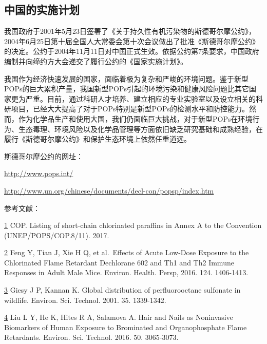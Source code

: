 \documentclass[
]{book}
\begin{document}
\hypertarget{ux4e2dux56fdux7684ux5b9eux65bdux8ba1ux5212}{%
\subsection{中国的实施计划}\label{ux4e2dux56fdux7684ux5b9eux65bdux8ba1ux5212}}

我国政府于2001年5月23日签署了《关于持久性有机污染物的斯德哥尔摩公约》，2004年6月25日第十届全国人大常委会第十次会议做出了批准《斯德哥尔摩公约》的决定。公约于2004年11月11日对中国正式生效。依据公约第7条要求，中国政府编制并向缔约方大会递交了履行公约的《国家实施计划》。

我国作为经济快速发展的国家，面临着极为复杂和严峻的环境问题。鉴于新型POPs的巨大累积产量，我国新型POPs引起的环境污染和健康风险问题比其它国家更为严重。目前，通过科研人才培养、建立相应的专业实验室以及设立相关的科研项目，已经大大提高了对于POPs特别是新型POPs的检测水平和防控能力。然而，作为化学品生产和使用大国，我们仍面临巨大挑战，对于新型POPs在环境行为、生态毒理、环境风险以及化学品管理等方面依旧缺乏研究基础和成熟经验，在履行《斯德哥尔摩公约》和保护生态环境上依然任重道远。

斯德哥尔摩公约的网址：

\url{http://www.pops.int/}

\url{http://www.un.org/chinese/documents/decl-con/popsp/index.htm}

参考文献：

\href{陈心想，耿增超。西北农林科技大学学报（自然科学版），2013，41:\%20167-174．}{1} COP. Listing of short-chain chlorinated paraffins in Annex A to the Convention (UNEP/POPS/COP.8/11). 2017.

\href{Kezhen\%20Qian,\%20Ajay\%20Kumar,\%20et.al.\%20Renew.\%20and\%20Sustain.\%20Energy\%20Reviews,\%202015,\%2042:\%201055-1064.}{2} Feng Y, Tian J, Xie H Q, et al.~Effects of Acute Low-Dose Exposure to the Chlorinated Flame Retardant Dechlorane 602 and Th1 and Th2 Immune Responses in Adult Male Mice. Environ. Health. Persp, 2016. 124. 1406-1413.

\href{Puga\%20A\%20P,\%20Abreu\%20C\%20A,\%20et\%20al.\%20J.\%20of\%20Environ.\%20Manage.,\%202015,\%20159:\%2086–93.}{3} Giesy J P, Kannan K. Global distribution of perfluorooctane sulfonate in wildlife. Environ. Sci. Technol. 2001. 35. 1339-1342.

\href{Khan\%20S,\%20Cai\%20Chao,\%20et\%20al．\%20Environ.\%20Sci.\%20\&\%20Technol.,\%202013,\%2047\%20:\%208624-8632．}{4} Liu L Y, He K, Hites R A, Salamova A. Hair and Nails as Noninvasive Biomarkers of Human Exposure to Brominated and Organophosphate Flame Retardants. Environ. Sci. Technol. 2016. 50. 3065-3073.
\end{document}
